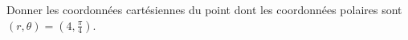 
\begin{exercice}\label{exoOutilsMath-0013}

	Donner les coordonnées cartésiennes du point dont les coordonnées polaires sont $(r,\theta)=\left( 4,\frac{ \pi }{ 4 } \right)$.

\end{exercice}
